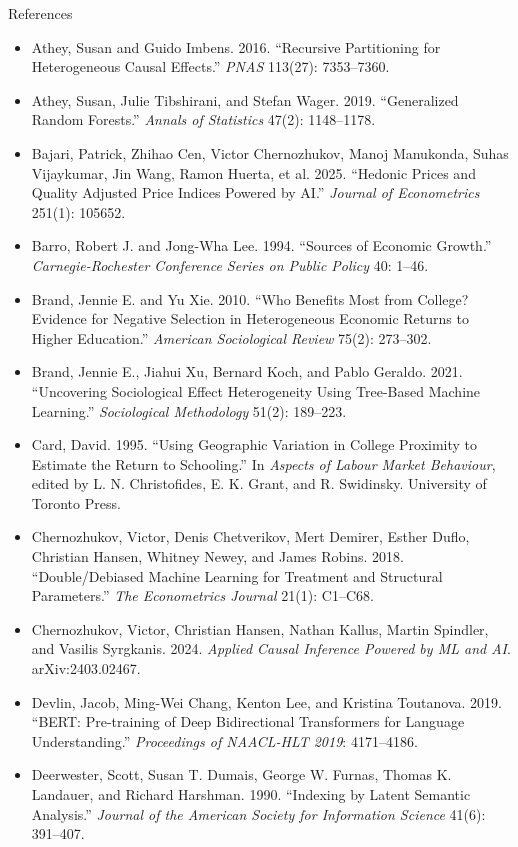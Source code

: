 \documentclass[aspectratio=169,11pt,xcolor=dvipsnames]{beamer}
\begin{document}
\begin{frame}[allowframebreaks,t]{References}
\footnotesize
\begin{itemize}\itemsep2pt
\item Athey, Susan and Guido Imbens. 2016. ``Recursive Partitioning for Heterogeneous Causal Effects.'' \textit{PNAS} 113(27): 7353--7360.
\item Athey, Susan, Julie Tibshirani, and Stefan Wager. 2019. ``Generalized Random Forests.'' \textit{Annals of Statistics} 47(2): 1148--1178.
\item Bajari, Patrick, Zhihao Cen, Victor Chernozhukov, Manoj Manukonda, Suhas Vijaykumar, Jin Wang, Ramon Huerta, et al. 2025. ``Hedonic Prices and Quality Adjusted Price Indices Powered by AI.'' \textit{Journal of Econometrics} 251(1): 105652.
\item Barro, Robert J. and Jong-Wha Lee. 1994. ``Sources of Economic Growth.'' \textit{Carnegie-Rochester Conference Series on Public Policy} 40: 1--46.
\item Brand, Jennie E. and Yu Xie. 2010. ``Who Benefits Most from College? Evidence for Negative Selection in Heterogeneous Economic Returns to Higher Education.'' \textit{American Sociological Review} 75(2): 273--302.
\item Brand, Jennie E., Jiahui Xu, Bernard Koch, and Pablo Geraldo. 2021. ``Uncovering Sociological Effect Heterogeneity Using Tree-Based Machine Learning.'' \textit{Sociological Methodology} 51(2): 189--223.
\item Card, David. 1995. ``Using Geographic Variation in College Proximity to Estimate the Return to Schooling.'' In \textit{Aspects of Labour Market Behaviour}, edited by L. N. Christofides, E. K. Grant, and R. Swidinsky. University of Toronto Press.
\item Chernozhukov, Victor, Denis Chetverikov, Mert Demirer, Esther Duflo, Christian Hansen, Whitney Newey, and James Robins. 2018. ``Double/Debiased Machine Learning for Treatment and Structural Parameters.'' \textit{The Econometrics Journal} 21(1): C1--C68.
\item Chernozhukov, Victor, Christian Hansen, Nathan Kallus, Martin Spindler, and Vasilis Syrgkanis. 2024. \textit{Applied Causal Inference Powered by ML and AI}. arXiv:2403.02467.
\item Devlin, Jacob, Ming-Wei Chang, Kenton Lee, and Kristina Toutanova. 2019. ``BERT: Pre-training of Deep Bidirectional Transformers for Language Understanding.'' \textit{Proceedings of NAACL-HLT 2019}: 4171--4186.
\item Deerwester, Scott, Susan T. Dumais, George W. Furnas, Thomas K. Landauer, and Richard Harshman. 1990. ``Indexing by Latent Semantic Analysis.'' \textit{Journal of the American Society for Information Science} 41(6): 391--407.

\end{itemize}
\end{frame}
\end{document}
